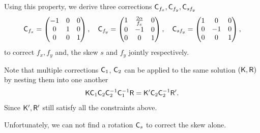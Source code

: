 Using this property, we derive three corrections $\mathsf{C}_{f_x},\mathsf{C}_{f_y},\mathsf{C}_{sf_y}  $
\begin{equation}
  \mathsf{C}_{f_x} = \begin{pmatrix}
                -1 & 0 & 0 \\
                0 & 1 & 0 \\
                0 & 0 & 1
            \end{pmatrix}, \quad 
                   \mathsf{C}_{f_y} = \begin{pmatrix}
                1 & \frac{2\alpha}{f_x} & 0 \\
                0 & -1 & 0 \\
                0 & 0 & 1
            \end{pmatrix}, \quad 
                     \mathsf{C}_{s f_y} = \begin{pmatrix}
                1 & 0 & 0 \\
                0 & -1 & 0 \\
                0 & 0 & 1
            \end{pmatrix},
\end{equation}
to correct $f_x, f_y$ and, the skew $s$ and $f_y$ jointly respectively.

Note that multiple corrections $\mathsf{C}_1$, $\mathsf{C}_2$ can be applied to the same solution $(\mathsf{K},\mathsf{R})$ by nesting them into one another
\begin{equation}
    \mathsf{K} \mathsf{C}_1 \mathsf{C}_2 \mathsf{C}_2^{-1} \mathsf{C}_1^{-1}\mathsf{R} = \mathsf{K}' \mathsf{C}_2 \mathsf{C}_2^{-1} \mathsf{R}'.
\end{equation}
Since $\mathsf{K}', \mathsf{R}'$ still satisfy all the constraints above.

Unfortunately, we can not find a rotation $\mathsf{C}_s$ to correct the skew alone.
